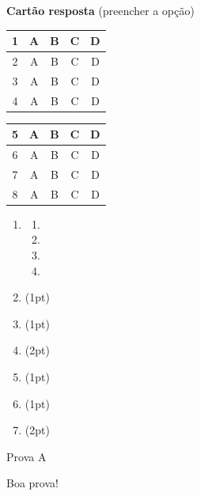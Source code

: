 \documentclass[a4paper]{article}
\begin{document}
\begin{multicols}{2}
{\bf Cartão resposta} (preencher a opção)

\begin{tabular}[!b]{|c|c|c|c|c|}
  \hline
  1 & A & B & C & D\\
  \hline
  2 & A & B & C & D\\
  \hline
  3 & A & B & C & D\\
  \hline
  4& A & B & C & D\\
  \hline
\end{tabular}
\begin{tabular}[!b]{|c|c|c|c|c|}
  \hline
  5 & A & B & C & D\\
  \hline
  6 & A & B & C & D\\
  \hline
  7& A & B & C & D\\
  \hline
  8 & A & B & C & D\\
  \hline
\end{tabular}

\begin{enumerate}
\item 
  \begin{enumerate}
  \item
  \item
  \item
  \item 
  \end{enumerate}

\vspace{0.1cm}

\item (1pt) 

\vspace{2cm}
\item (1pt) 

\vspace{3cm}
\item (2pt) 

\vspace{4cm}
\item (1pt) 

\vspace{3cm}

\item (1pt) 

\vspace{5cm}
\item (2pt) 


\vfill
\end{enumerate}
\end{multicols}

\newpage
{\hfill Prova A\par}

\vfill
\begin{center}Boa prova!\end{center}
\end{document}
